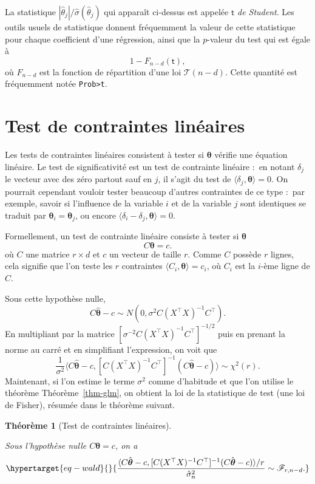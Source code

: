 \documentclass[
  10,
  letterpaper,
  DIV=11,
  numbers=noendperiod]{scrreport}
\newcommand{\bt}{\boldsymbol{\theta}}
\theoremstyle{plain}
\newtheorem{theorem}{Théorème}[chapter]
\theoremstyle{definition}
\theoremstyle{plain}
\theoremstyle{definition}
\theoremstyle{definition}
\theoremstyle{plain}
\theoremstyle{remark}
\begin{document}
La statistique \(|\hat{\theta}_j|/\hat{\sigma}(\hat{\theta}_j)\) qui
apparaît ci-dessus est appelée \emph{\(\mathsf{t}\) de Student}. Les
outils usuels de statistique donnent fréquemment la valeur de cette
statistique pour chaque coefficient d'une régression, ainsi que la
\(p\)-valeur du test qui est égale à \[1-F_{n-d}(\mathsf{t}), \] où
\(F_{n-d}\) est la fonction de répartition d'une loi
\(\mathscr{T}(n-d)\). Cette quantité est fréquemment notée
\texttt{Prob\textgreater{}t}.

\hypertarget{test-de-contraintes-linuxe9aires}{%
\section{Test de contraintes
linéaires}\label{test-de-contraintes-linuxe9aires}}

Les tests de contraintes linéaires consistent à tester si \(\bt\)
vérifie une équation linéaire. Le test de significativité est un test de
contrainte linéaire :~en notant \(\delta_j\) le vecteur avec des zéro
partout sauf en \(j\), il s'agit du test de
\(\langle \delta_j, \bt\rangle = 0\). On pourrait cependant vouloir
tester beaucoup d'autres contraintes de ce type :~par exemple, savoir si
l'influence de la variable \(i\) et de la variable \(j\) sont identiques
se traduit par \(\bt_i = \bt_j\), ou encore
\(\langle \delta_i - \delta_j, \bt\rangle = 0\).

Formellement, un test de contrainte linéaire consiste à tester si
\(\bt\) \[C\bt = c.\] où \(C\) une matrice \(r \times d\) et \(c\) un
vecteur de taille \(r\). Comme \(C\) possède \(r\) lignes, cela signifie
que l'on teste les \(r\) contraintes \(\langle C_i, \bt\rangle = c_i\),
où \(C_i\) est la \(i\)-ème ligne de \(C\).

Sous cette hypothèse nulle,
\[C\hat{\bt}-c \sim N(0, \sigma^2 C(X^\top X)^{-1}C^\top).\] En
multipliant par la matrice
\([\sigma^{-2}C(X^\top X)^{-1}C^\top]^{-1/2}\) puis en prenant la norme
au carré et en simplifiant l'expression, on voit que
\[ \frac{1}{\sigma^2}\langle C\hat{\bt}-c, [C(X^\top X)^{-1}C^\top]^{-1} (C\hat{\bt}-c)\rangle \sim \chi^2(r).\]
Maintenant, si l'on estime le terme \(\sigma^2\) comme d'habitude et que
l'on utilise le théorème Théorème~\ref{thm-glm}, on obtient la loi de la
statistique de test (une loi de Fisher), résumée dans le théorème
suivant.

\begin{theorem}[Test de contraintes
linéaires]\protect\hypertarget{thm-Wald}{}\label{thm-Wald}

Sous l'hypothèse nulle \(C\bt = c\), on a
\begin{equation}\protect\hypertarget{eq-wald}{}{ \frac{\langle C\hat{\bt}-c, [C(X^\top X)^{-1}C^\top]^{-1} (C\hat{\bt}-c)\rangle /r}{\hat{\sigma}_n^2} \sim \mathscr{F}_{r, n-d}.}\label{eq-wald}\end{equation}

\end{theorem}
\end{document}
